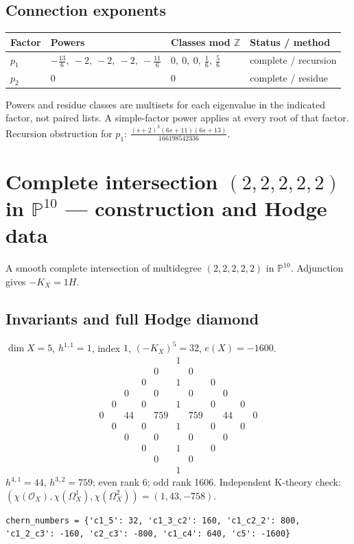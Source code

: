 \documentclass[10pt,a4paper]{article}
\begin{document}
\subsection*{Connection exponents}
\begin{center}\begin{tabular}{llll}\toprule Factor & Powers & Classes mod $\mathbb Z$ & Status / method\\\midrule
$p_{1}$ & $- \frac{13}{6},\ -2,\ -2,\ -2,\ - \frac{11}{6}$ & $0,\ 0,\ 0,\ \frac{1}{6},\ \frac{5}{6}$ & complete / recursion\\
$p_{2}$ & $0$ & $0$ & complete / residue\\
\bottomrule\end{tabular}\end{center}
Powers and residue classes are multisets for each eigenvalue in the indicated factor, not paired lists. A simple-factor power applies at every root of that factor.
Recursion obstruction for $p_{1}$: $\frac{\left(s + 2\right)^{3} \left(6 s + 11\right) \left(6 s + 13\right)}{166198542336}$.
\clearpage\section*{Complete intersection $(2,2,2,2,2)$ in $\mathbb P^{10}$ --- construction and Hodge data}\label{entry:PCI5-2-2-2-2-2}
A smooth complete intersection of multidegree $(2,2,2,2,2)$ in $\mathbb P^{10}$.
Adjunction gives $-K_X=1H$.
\subsection*{Invariants and full Hodge diamond}
$\dim X=5$, $h^{1,1}=1$, index $1$, $(-K_X)^5=32$, $e(X)=-1600$.
\[\begin{array}{ccccccccccc}&&&&&1&&&&&\\&&&&0&&0&&&&\\&&&0&&1&&0&&&\\&&0&&0&&0&&0&&\\&0&&0&&1&&0&&0&\\0&&44&&759&&759&&44&&0\\&0&&0&&1&&0&&0&\\&&0&&0&&0&&0&&\\&&&0&&1&&0&&&\\&&&&0&&0&&&&\\&&&&&1&&&&&\end{array}\]
$h^{4,1}=44$, $h^{3,2}=759$; even rank 6; odd rank 1606.
Independent K-theory check: $(\chi(\mathcal O_X),\chi(\Omega_X^1),\chi(\Omega_X^2))=(1, 43, -758)$.
\begin{lstlisting}
chern_numbers = {'c1_5': 32, 'c1_3_c2': 160, 'c1_c2_2': 800, 'c1_2_c3': -160, 'c2_c3': -800, 'c1_c4': 640, 'c5': -1600}
\end{lstlisting}
\end{document}
